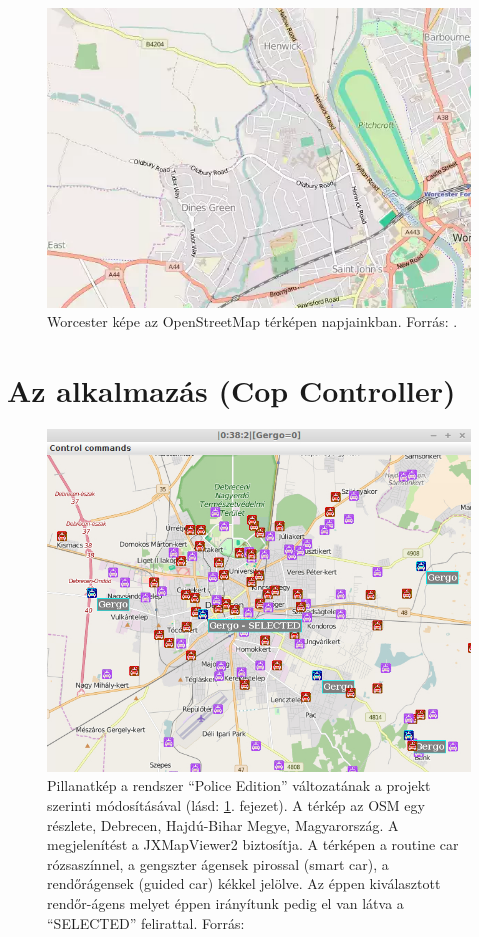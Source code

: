 \documentclass[a4paper,12pt]{report}
\begin{document}
\begin{figure}[ht]
\centering
\includegraphics[width=5in]{img/newworcester}
\caption{Worcester képe az OpenStreetMap térképen napjainkban. Forrás: \cite{osm}.}
\label{newworcester}
\end{figure}

\newpage
\chapter{Az alkalmazás (Cop Controller)}
\label{theapp}

\begin{figure}[ht]
\centerline{
\includegraphics[width=6in]{img/copselected}}
\caption{Pillanatkép a rendszer ``Police Edition'' változatának a projekt szerinti módosításával (lásd: \ref{theapp}. fejezet). A térkép az OSM egy részlete, Debrecen, Hajdú-Bihar Megye, Magyarország. A megjelenítést a JXMapViewer2 \cite{jxmapv} biztosítja. A térképen a routine car rózsaszínnel, a gengszter ágensek pirossal (smart car), a rendőrágensek (guided car) kékkel jelölve. Az éppen kiválasztott rendőr-ágens melyet éppen irányítunk pedig el van látva a ``SELECTED'' felirattal. Forrás: \cite{infocomjournal} 
\label{police}}
\end{figure}
\end{document}
